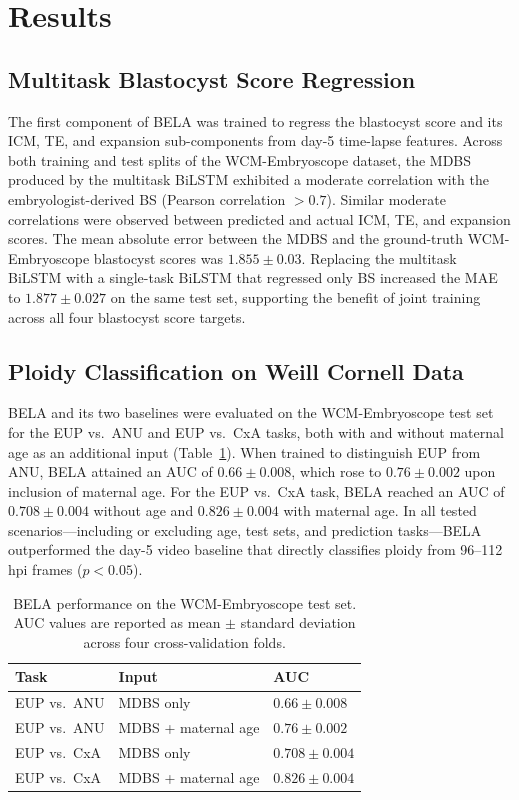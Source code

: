 \documentclass[11pt,a4paper]{article}
\begin{document}
\section{Results}\label{sec:results}

\subsection{Multitask Blastocyst Score Regression}

The first component of BELA was trained to regress the blastocyst score
and its ICM, TE, and expansion sub-components from day-5 time-lapse
features. Across both training and test splits of the WCM-Embryoscope
dataset, the MDBS produced by the multitask BiLSTM exhibited a moderate
correlation with the embryologist-derived BS (Pearson correlation
$>0.7$). Similar moderate correlations were observed between predicted
and actual ICM, TE, and expansion scores. The mean absolute error between
the MDBS and the ground-truth WCM-Embryoscope blastocyst scores was
$1.855 \pm 0.03$. Replacing the multitask BiLSTM with a single-task BiLSTM
that regressed only BS increased the MAE to $1.877 \pm 0.027$ on the same
test set, supporting the benefit of joint training across all four
blastocyst score targets.

\subsection{Ploidy Classification on Weill Cornell Data}

BELA and its two baselines were evaluated on the WCM-Embryoscope test set
for the EUP vs.\ ANU and EUP vs.\ CxA tasks, both with and without
maternal age as an additional input (Table~\ref{tab:bela_auc}). When
trained to distinguish EUP from ANU, BELA attained an AUC of $0.66 \pm
0.008$, which rose to $0.76 \pm 0.002$ upon inclusion of maternal age.
For the EUP vs.\ CxA task, BELA reached an AUC of $0.708 \pm 0.004$
without age and $0.826 \pm 0.004$ with maternal age. In all tested
scenarios---including or excluding age, test sets, and prediction
tasks---BELA outperformed the day-5 video baseline that directly
classifies ploidy from 96--112 hpi frames ($p < 0.05$).

\begin{table}[t]
\centering
\caption{BELA performance on the WCM-Embryoscope test set. AUC values are
reported as mean $\pm$ standard deviation across four cross-validation
folds.}
\label{tab:bela_auc}
\begin{tabular}{lll}
\toprule
Task & Input & AUC \\
\midrule
EUP vs.\ ANU & MDBS only & $0.66 \pm 0.008$ \\
EUP vs.\ ANU & MDBS + maternal age & $0.76 \pm 0.002$ \\
EUP vs.\ CxA & MDBS only & $0.708 \pm 0.004$ \\
EUP vs.\ CxA & MDBS + maternal age & $0.826 \pm 0.004$ \\
\bottomrule
\end{tabular}
\end{table}
\end{document}
